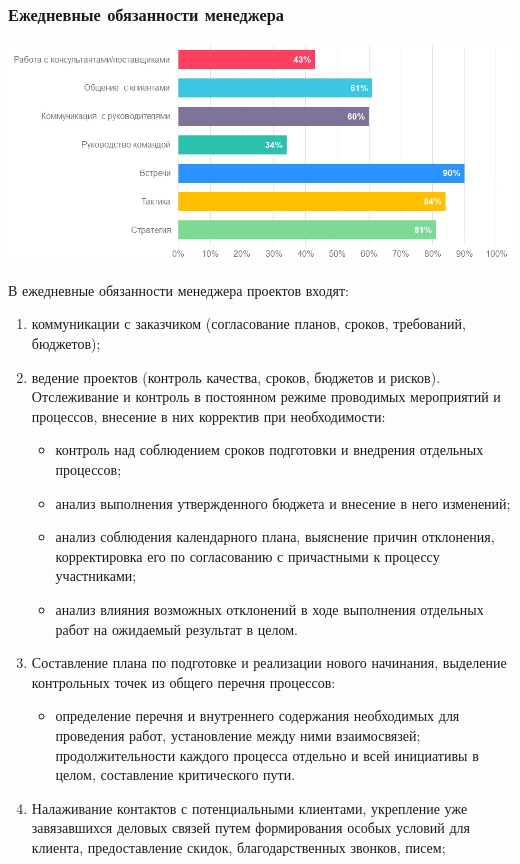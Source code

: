 \documentclass{../industrial-development}
\begin{document}
\begin{frame} \frametitle{Ежедневные обязанности менеджера}
{\includegraphics[width=1\linewidth]{day.png}}
\end{frame}
\lecturenotes
В ежедневные обязанности менеджера проектов входят: 
\begin{enumerate} 
\item коммуникации с заказчиком (согласование планов, сроков, требований, бюджетов); 
\item ведение проектов (контроль качества, сроков, бюджетов и рисков). Отслеживание и контроль в постоянном режиме проводимых мероприятий и процессов, внесение в них корректив при необходимости: 
\begin{itemize} 
\item контроль над соблюдением сроков подготовки и внедрения отдельных процессов; 
\item анализ выполнения утвержденного бюджета и внесение в него изменений; 
\item анализ соблюдения календарного плана, выяснение причин отклонения, корректировка его по согласованию с причастными к процессу участниками; 
\item анализ влияния возможных отклонений в ходе выполнения отдельных работ на ожидаемый результат в целом. 
\end{itemize} 
\item Составление плана по подготовке и реализации нового начинания, выделение контрольных точек из общего перечня процессов: 
\begin{itemize} 
\item определение перечня и внутреннего содержания необходимых для проведения работ, установление между ними взаимосвязей; 
 продолжительности каждого процесса отдельно и всей инициативы в целом, составление критического пути. 
\end{itemize} 
\item Налаживание контактов с потенциальными клиентами, укрепление уже завязавшихся деловых связей путем формирования особых условий для клиента, предоставление скидок, благодарственных звонков, писем; 

\end{enumerate}
\end{document}
